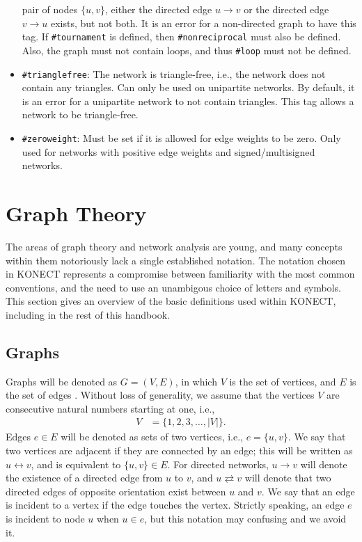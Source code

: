\documentclass{article}
\begin{document}
\begin{itemize}
  pair of nodes $\{u,v\}$, either the directed edge $u \rightarrow v$ or
  the directed edge $v \rightarrow u$ exists, but not both.  It
  is an error for a non-directed graph to have this tag.  If
  \texttt{\#tournament} is defined, then
  \texttt{\#nonreciprocal} must also be defined.  Also, the graph must
  not contain loops, and thus
  \texttt{\#loop} must not be defined. 
\item \texttt{\#trianglefree}:  The network is triangle-free, i.e., the
  network does not contain any triangles.  Can only be used on
  unipartite networks.  By default, it is an error for a unipartite
  network to not contain triangles.  This tag allows a network to be
  triangle-free. 
\item \texttt{\#zeroweight}:  Must be set if it is allowed for edge
  weights to be zero. Only used for networks with positive edge
  weights and signed/multisigned networks. 
\end{itemize}

\section{Graph Theory}
\label{sec:definitions}
The areas of graph theory and network analysis are young, and
many concepts within them notoriously lack a single established notation.  The
notation chosen in KONECT represents a compromise between familiarity
with the most common conventions, and the need to use an unambigous
choice of letters and symbols.  This section gives an overview of the
basic definitions used within KONECT, including in the rest of this handbook. 

\subsection{Graphs}
Graphs will be denoted as $G=(V,E)$, in which $V$ is the set of
vertices, and $E$ is the set of edges \citep{b116}. Without loss of
generality, we assume that the vertices $V$ are consecutive natural
numbers starting at one, i.e.,
\begin{align}
  V &= \{ 1, 2, 3, \dotsc, |V| \}.
\end{align}
Edges $e\in E$ will be denoted as sets of two vertices, i.e.,
$e=\{u,v\}$.  We say that two vertices are adjacent if they are
connected by an edge; this will be written as $u \leftrightarrow v$, and is equivalent to $\{u,v\}\in E$. 
For directed networks, $u \rightarrow v$ will denote the existence of a
directed edge from $u$ to $v$, and $u \rightleftarrows v$ will denote
that two directed edges of opposite orientation exist between $u$ and $v$.
We say that an
edge is incident to a vertex if the edge touches the vertex. Strictly
speaking, an edge $e$ is incident to node $u$ when $u\in e$, but this
notation may confusing and we avoid it. 
\end{document}
